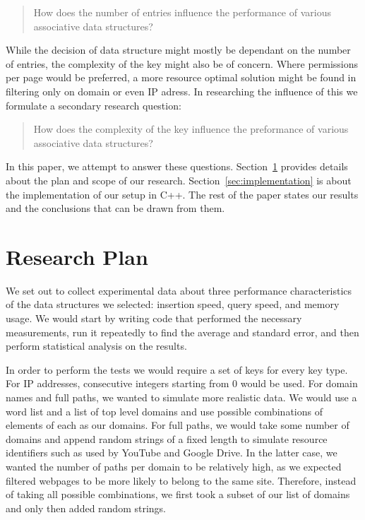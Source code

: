 \documentclass[12pt,a4paper]{article}
\begin{document}
    \begin{quotation}
        How does the number of entries influence the performance of various associative data
        structures?
    \end{quotation}

    While the decision of data structure might mostly be dependant on the number of entries, the
    complexity of the key might also be of concern. Where permissions per page would be preferred, a
    more resource optimal solution might be found in filtering only on domain or even IP adress.  In
    researching the influence of this we formulate a secondary research question:

    \begin{quotation}
        How does the complexity of the key influence the preformance of various associative data structures?
    \end{quotation}

    In this paper, we attempt to answer these questions. Section~\ref{sec:plan} provides details
    about the plan and scope of our research. Section~\ref{sec:implementation} is about the
    implementation of our setup in C++.  The rest of the paper states our results and the
    conclusions that can be drawn from them.


    \section{Research Plan}
    \label{sec:plan}

    We set out to collect experimental data about three performance characteristics of the data
    structures we selected: insertion speed, query speed, and memory usage.  We would start by
    writing code that performed the necessary measurements, run it repeatedly to find the average
    and standard error, and then perform statistical analysis on the results.

    In order to perform the tests we would require a set of keys for every key type.  For IP
    addresses, consecutive integers starting from 0 would be used.  For domain names and full paths,
    we wanted to simulate more realistic data.  We would use a word list and a list of top level
    domains and use possible combinations of elements of each as our domains.  For full paths, we
    would take some number of domains and append random strings of a fixed length to simulate
    resource identifiers such as used by YouTube and Google Drive.  In the latter case, we wanted
    the number of paths per domain to be relatively high, as we expected filtered webpages to be
    more likely to belong to the same site.  Therefore, instead of taking all possible combinations,
    we first took a subset of our list of domains and only then added random strings.
\end{document}
